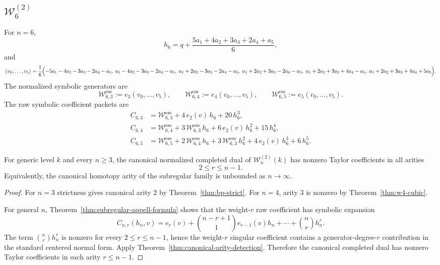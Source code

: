 \subsection{\texorpdfstring{$\mathcal W_6^{(2)}$}{W6(2)}}

For $n=6$,
\[
h_6=q+\frac{5a_1+4a_2+3a_3+2a_4+a_5}{6},
\]
and
\[
(v_0,\dots,v_5)
=
\frac{1}{6}
\Bigl(
-5a_1-4a_2-3a_3-2a_4-a_5,\;
a_1-4a_2-3a_3-2a_4-a_5,\;
a_1+2a_2-3a_3-2a_4-a_5,\;
a_1+2a_2+3a_3-2a_4-a_5,\;
a_1+2a_2+3a_3+4a_4-a_5,\;
a_1+2a_2+3a_3+4a_4+5a_5
\Bigr).
\]
The normalized symbolic generators are
\[
\mathcal W^{\mathrm{ess}}_{6,3}:=e_3(v_0,\dots,v_5),
\qquad
\mathcal W^{\mathrm{ess}}_{6,4}:=e_4(v_0,\dots,v_5),
\qquad
\mathcal W^{\mathrm{ess}}_{6,5}:=e_5(v_0,\dots,v_5).
\]
The raw symbolic coefficient packets are
\begin{align}
C_{6,3}
&=
\mathcal W^{\mathrm{ess}}_{6,3}
+4\,e_2(v)\,h_6
+20\,h_6^3,
\label{eq:w6-c3}
\\[4pt]
C_{6,4}
&=
\mathcal W^{\mathrm{ess}}_{6,4}
+3\,\mathcal W^{\mathrm{ess}}_{6,3}\,h_6
+6\,e_2(v)\,h_6^2
+15\,h_6^4,
\label{eq:w6-c4}
\\[4pt]
C_{6,5}
&=
\mathcal W^{\mathrm{ess}}_{6,5}
+2\,\mathcal W^{\mathrm{ess}}_{6,4}\,h_6
+3\,\mathcal W^{\mathrm{ess}}_{6,3}\,h_6^2
+4\,e_2(v)\,h_6^3
+6\,h_6^5.
\label{eq:w6-c5}
\end{align}

\begin{theorem}
\label{thm:unbounded-canonical-arity}
For generic level $k$ and every $n\geq 3$, the canonical normalized completed
dual of $\mathcal W_n^{(2)}(k)$ has nonzero Taylor coefficients in all arities
\[
2\leq r\leq n-1.
\]
Equivalently, the canonical homotopy arity of the subregular family is
unbounded as $n\to\infty$.
\end{theorem}

\begin{proof}
For $n=3$ strictness gives canonical arity $2$ by
Theorem~\ref{thm:bp-strict}.  For $n=4$, arity $3$ is nonzero by
Theorem~\ref{thm:w4-cubic}.

For general $n$, Theorem~\ref{thm:subregular-appell-formula} shows that the
weight-$r$ raw coefficient has symbolic expansion
\[
C_{n,r}(h_n,v)=e_r(v)+\binom{n-r+1}{1}e_{r-1}(v)h_n+\cdots+\binom{n}{r}h_n^r.
\]
The term $\binom{n}{r}h_n^r$ is nonzero for every $2\leq r\leq n-1$, hence the
weight-$r$ singular coefficient contains a generator-degree-$r$ contribution in
the standard centered normal form.  Apply
Theorem~\ref{thm:canonical-arity-detection}.  Therefore the canonical completed
dual has nonzero Taylor coefficients in each arity $r\leq n-1$.
\end{proof}

